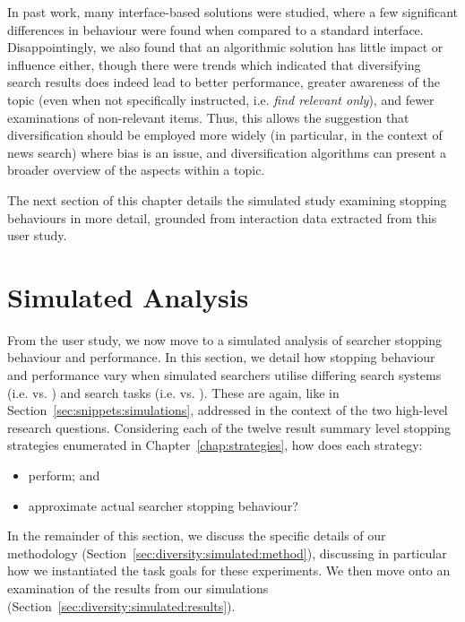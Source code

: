 In past work, many interface-based solutions were studied, where a few significant differences in behaviour were found when compared to a standard interface. Disappointingly, we also found that an algorithmic solution has little impact or influence either, though there were trends which indicated that diversifying search results does indeed lead to better performance, greater awareness of the topic (even when not specifically instructed, i.e. \emph{find relevant only}), and fewer examinations of non-relevant items. Thus, this allows the suggestion that diversification should be employed more widely (in particular, in the context of news search) where bias is an issue, and diversification algorithms can present a broader overview of the aspects within a topic.

The next section of this chapter details the simulated study examining stopping behaviours in more detail, grounded from interaction data extracted from this user study.

\section{Simulated Analysis}\label{sec:diversity:simulated}
From the user study, we now move to a simulated analysis of searcher stopping behaviour and performance. In this section, we detail how stopping behaviour and performance vary when simulated searchers utilise differing search systems (i.e.  vs. ) and search tasks (i.e.  vs. ). These are again, like in Section~\ref{sec:snippets:simulations}, addressed in the context of the two high-level research questions. Considering each of the twelve result summary level stopping strategies enumerated in Chapter~\ref{chap:strategies}, how does each strategy:

\begin{itemize}
    \item{ perform; and}
    \item{ approximate actual searcher stopping behaviour?}
\end{itemize}

In the remainder of this section, we discuss the specific details of our methodology (Section~\ref{sec:diversity:simulated:method}), discussing in particular how we instantiated the task goals for these experiments. We then move onto an examination of the results from our simulations (Section~\ref{sec:diversity:simulated:results}).


